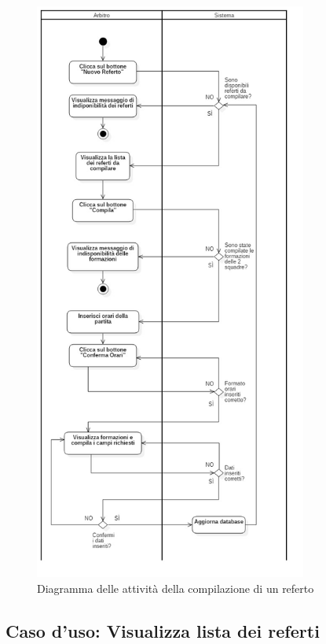%
%
\begin{figure}[h]
	\centering
	\includegraphics[width=0.8\textwidth]
	{immagini/ad-referto}
	
	\caption{Diagramma delle attività della compilazione di un referto}
	\label{ad-referto}
\end{figure}


%
%
\subsection{Caso d'uso: Visualizza lista dei referti}
\label{uc-visualizza-lista-referti}

